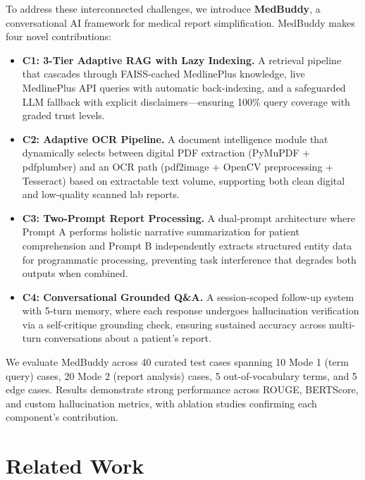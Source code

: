 \documentclass[conference]{IEEEtran}
\begin{document}
To address these interconnected challenges, we introduce \textbf{MedBuddy}, a conversational AI framework for medical report simplification. MedBuddy makes four novel contributions:

\begin{itemize}
    \item \textbf{C1: 3-Tier Adaptive RAG with Lazy Indexing.} A retrieval pipeline that cascades through FAISS-cached MedlinePlus knowledge, live MedlinePlus API queries with automatic back-indexing, and a safeguarded LLM fallback with explicit disclaimers---ensuring 100\% query coverage with graded trust levels.
    
    \item \textbf{C2: Adaptive OCR Pipeline.} A document intelligence module that dynamically selects between digital PDF extraction (PyMuPDF + pdfplumber) and an OCR path (pdf2image + OpenCV preprocessing + Tesseract) based on extractable text volume, supporting both clean digital and low-quality scanned lab reports.
    
    \item \textbf{C3: Two-Prompt Report Processing.} A dual-prompt architecture where Prompt A performs holistic narrative summarization for patient comprehension and Prompt B independently extracts structured entity data for programmatic processing, preventing task interference that degrades both outputs when combined.
    
    \item \textbf{C4: Conversational Grounded Q\&A.} A session-scoped follow-up system with 5-turn memory, where each response undergoes hallucination verification via a self-critique grounding check, ensuring sustained accuracy across multi-turn conversations about a patient's report.
\end{itemize}

We evaluate MedBuddy across 40 curated test cases spanning 10 Mode 1 (term query) cases, 20 Mode 2 (report analysis) cases, 5 out-of-vocabulary terms, and 5 edge cases. Results demonstrate strong performance across ROUGE, BERTScore, and custom hallucination metrics, with ablation studies confirming each component's contribution.

\section{Related Work}
\end{document}
